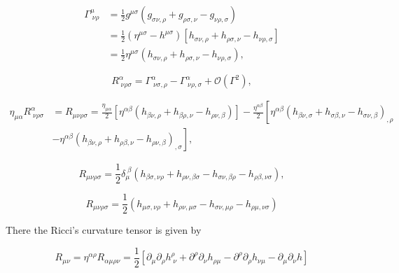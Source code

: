         \begin{align*}
            \Gamma^{\mu}_{\;\nu\rho} &= \frac{1}{2}g^{\mu\sigma}\left(g_{\sigma\nu,\rho} + g_{\rho\sigma,\nu} - g_{\nu\rho,\sigma} \right)\\
            &=\frac{1}{2}\left(\eta^{\mu\sigma} - h^{\mu\sigma} \right)\left[h_{\sigma\nu,\rho} + h_{\rho\sigma,\nu} - h_{\nu\rho,\sigma} \right]\\
            &=\frac{1}{2}\eta^{\mu\sigma}\left(h_{\sigma\nu,\rho} + h_{\rho\sigma,\nu} - h_{\nu\rho,\sigma} \right),
        \end{align*}

        \begin{equation}
            R^{\alpha}_{\;\nu\rho\sigma}=\Gamma^{\alpha}_{\;\nu\sigma,\rho}-\Gamma^{\alpha}_{\;\nu\rho,\sigma} + \mathcal{O}(\Gamma^2),
        \end{equation}

        \begin{align*}
            \eta_{\mu\alpha}R^{\alpha}_{\;\nu\rho\sigma}&=R_{\mu\nu\rho\sigma}=\frac{\eta_{\mu\alpha}}{2}\left[\eta^{\alpha\beta}\left(h_{\beta\nu,\rho} + h_{\beta\rho,\nu} - h_{\rho\nu,\beta} \right) \right] - \frac{\eta^{\alpha\beta}}{2}\left[ \eta^{\alpha\beta}\left(h_{\beta\nu,\sigma}+h_{\sigma\beta,\nu}-h_{\sigma\nu,\beta} \right)_{,\rho}\right.\\
            &\left.-\eta^{\alpha\beta}\left(h_{\beta\nu,\rho} + h_{\rho\beta,\nu} - h_{\rho\nu,\beta} \right)_{,\sigma} \right],
        \end{align*}

        \begin{equation}
            R_{\mu\nu\rho\sigma}=\frac{1}{2}\delta_{\mu}^{\;\beta} \left(h_{\beta\sigma,\nu\rho} + h_{\rho\nu,\beta\sigma} - h_{\sigma\nu,\beta\rho} - h_{\rho\beta,\nu\sigma} \right),
        \end{equation}

        \begin{equation}
            R_{\mu\nu\rho\sigma} = \frac{1}{2}\left(h_{\mu\sigma,\nu\rho} + h_{\rho\nu,\mu\sigma} - h_{\sigma\nu,\mu\rho} - h_{\rho\mu,\nu\sigma} \right)
        \end{equation}


        There the Ricci's curvature tensor is given by

        \begin{equation}
            R_{\mu\nu} = \eta^{\alpha\rho}R_{\alpha\mu\rho\nu} = \frac{1}{2}\left[\partial_{\mu}\partial_{\rho}h^{\rho}_{\;\nu} + \partial^{\rho}\partial_{\nu}h_{\rho\mu} - \partial^{\rho}\partial_{\rho}h_{\nu\mu} - \partial_{\mu}\partial_{\nu}h \right]
        \end{equation}
        

